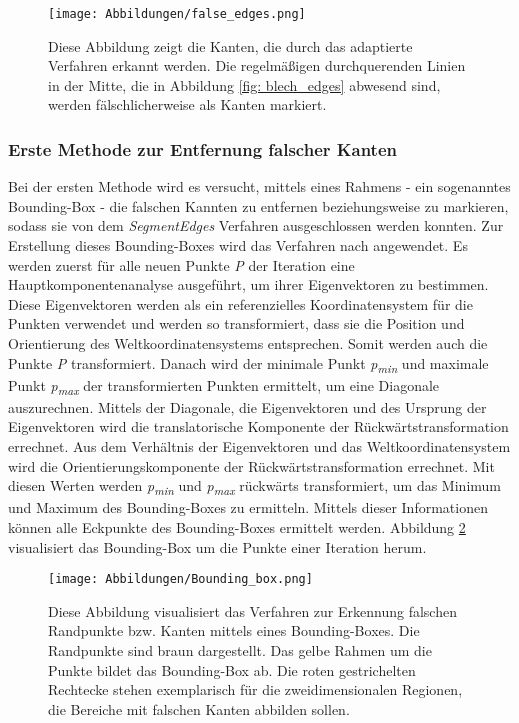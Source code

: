 \begin{figure}[h]
	\texttt{[image: Abbildungen/false\_edges.png]}
	\centering
	\caption{Diese Abbildung zeigt die Kanten, die durch das adaptierte Verfahren erkannt werden. Die regelmäßigen durchquerenden Linien in der Mitte, die in Abbildung \ref{fig: blech_edges} abwesend sind, werden fälschlicherweise als Kanten markiert. }
	\label{fig: false_edges}
\end{figure}

\subsubsection{Erste Methode zur Entfernung falscher Kanten}
Bei der ersten Methode wird es versucht, mittels eines Rahmens - ein sogenanntes Bounding-Box - die falschen Kannten zu entfernen beziehungsweise zu markieren, sodass sie von dem \textit{SegmentEdges} Verfahren ausgeschlossen werden konnten. Zur Erstellung dieses Bounding-Boxes wird das Verfahren nach \textcite{mccormick_find_2015} angewendet. Es werden zuerst für alle neuen Punkte \textit{P} der Iteration eine Hauptkomponentenanalyse ausgeführt, um ihrer Eigenvektoren zu bestimmen. Diese Eigenvektoren werden als ein referenzielles Koordinatensystem für die Punkten verwendet und werden so transformiert, dass sie die Position und Orientierung des Weltkoordinatensystems entsprechen. Somit werden auch die Punkte \textit{P} transformiert. Danach wird der minimale Punkt \textit{p\textsubscript{min}} und maximale Punkt \textit{p\textsubscript{max}} der transformierten Punkten ermittelt, um eine Diagonale auszurechnen. Mittels der Diagonale, die Eigenvektoren und des Ursprung der Eigenvektoren wird die translatorische Komponente der Rückwärtstransformation errechnet. Aus dem Verhältnis der Eigenvektoren und das Weltkoordinatensystem wird die Orientierungskomponente der Rückwärtstransformation errechnet. Mit diesen Werten werden \textit{p\textsubscript{min}} und \textit{p\textsubscript{max}} rückwärts transformiert, um das Minimum und Maximum des Bounding-Boxes zu ermitteln. Mittels dieser Informationen können alle Eckpunkte des Bounding-Boxes ermittelt werden. Abbildung \ref{fig: bounding_box} visualisiert das Bounding-Box um die Punkte einer Iteration herum.

\begin{figure}[h]
	\texttt{[image: Abbildungen/Bounding\_box.png]}
	\centering
	\caption{Diese Abbildung visualisiert das Verfahren zur Erkennung falschen Randpunkte bzw. Kanten mittels eines Bounding-Boxes. Die Randpunkte sind braun dargestellt. Das gelbe Rahmen um die Punkte bildet das Bounding-Box ab. Die roten gestrichelten Rechtecke stehen exemplarisch für die zweidimensionalen Regionen, die Bereiche mit falschen Kanten abbilden sollen.}
	\label{fig: bounding_box}
\end{figure}

